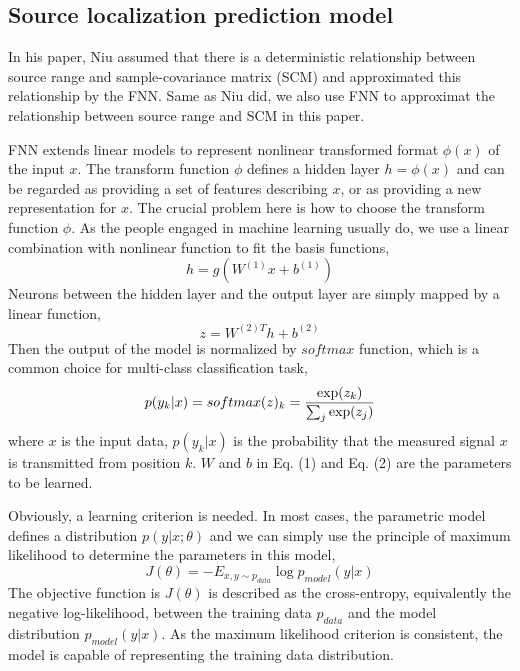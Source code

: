 \subsection{Source localization prediction model}
In his paper\cite{niu2017source}, Niu assumed that there is a deterministic relationship between source range and sample-covariance matrix (SCM) and approximated this relationship by the FNN. Same as Niu did, we also use FNN to approximat the relationship between
source range and SCM in this paper.

FNN extends linear models to represent nonlinear transformed format $\phi(x)$ of the input $x$. The transform function $\phi$ defines a hidden layer $h=\phi(x)$ and can be regarded as providing a set of features describing $x$, or as providing a new representation for $x$. The crucial problem here is how to choose the transform function $\phi$. As the people engaged in machine learning usually do, we use a linear combination with nonlinear function to fit the basis functions,
\begin{equation}
h = g(W^{(1)}x + b^{(1)})
\end{equation}
Neurons between the hidden layer and the output layer are simply mapped by a linear function,
\begin{equation}
z = {W^{(2)T}}h + {b^{(2)}}
\end{equation}
Then the output of the model is normalized by $ softmax $ function, which is a common choice for multi-class classification task\cite{bishop2006pattern},
\begin{equation}
p({y_k}|x) = softmax {(z)_k} = {{\exp ({z_k})} \over {\sum\nolimits_j {\exp ({z_j})} }}
\end{equation}
where $x$ is the input data, $p({y_k}|x)$ is the probability that the measured signal $x$ is transmitted from position $k$. $W$ and $b$ in Eq. (1) and Eq. (2) are the parameters to be learned.

Obviously, a learning criterion is needed. In most cases, the parametric model defines a distribution $p(y|x;\theta)$ and we can simply use the principle of maximum likelihood to determine the parameters in this model,
\begin{equation}
J(\theta ) =  - {E_{x,y \sim {p_{data}}}}\log {p_{model}}(y|x)
\end{equation}
The objective function is $J(\theta )$ is described as the cross-entropy, equivalently the negative log-likelihood, between the training data $p_{data}$ and the model distribution ${p_{model}}(y|x)$.
As the maximum likelihood criterion is consistent, the model is capable of representing the training data distribution.


